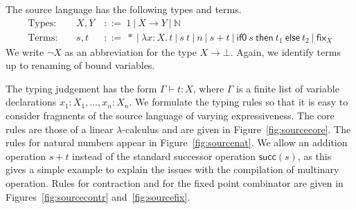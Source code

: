 \documentclass{LMCS}
\theoremstyle{definition}
\theoremstyle{plain}
\newcommand{\kw}[1]{\mathsf{#1}}
\newcommand{\NN}{\mathbb{N}}
\newcommand{\Mid}{\ \mathrel{\big|} \ }
\newcommand{\I}[2]{#1 \colon #2}
\newcommand{\SeqTm}[3]{#1 \vdash #2 \colon #3}
\newcommand{\tlami}[3]{\lambda {#1}{:}{#2}.\, {#3}}
\newcommand{\tif}[3]{\kw{if0}\ #1\ \kw{then}\ #2\ \kw{else}\ #3}
\begin{document}
The source language has the following types and terms.
\begin{align*}
  \text{Types: } && 
  X, Y &\ ::=\  1  \Mid X \to Y \Mid \NN  \\
  \text{Terms: } && s, t  &\ ::=\  
    * \Mid \tlami x X t \Mid s\ t 
     \Mid n \Mid s+t 
     \Mid \tif s {t_1} {t_2}
     \Mid \kw{fix}_X
\end{align*}
We write $\neg X$ as an abbreviation for the type $X\to \bot$.
Again, we identify terms up to renaming of bound variables. 

The typing judgement has the form $\SeqTm{\Gamma}{t}{X}$,
where $\Gamma$ is a finite list of variable declarations
$\I {x_1} {X_1},\dots, \I {x_n} {X_n}$.
We formulate the typing rules so that 
it is easy to consider fragments of the source language
of varying expressiveness.
The core rules are those of a linear $\lambda$-calculus 
and are given in Figure~\ref{fig:sourcecore}.
The rules for natural numbers appear in Figure~\ref{fig:sourcenat}.
We allow an addition operation $s+t$ instead of
the standard successor operation $\kw{succ}(s)$, as this gives a
simple example to explain the issues with the compilation of
multinary operation. 
Rules for contraction and for the fixed point combinator are 
given in Figures~\ref{fig:sourcecontr} and~\ref{fig:sourcefix}.
\end{document}
